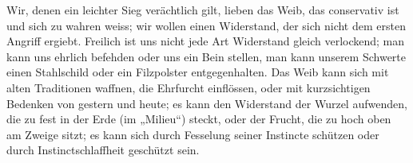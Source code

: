 Wir, denen ein leichter Sieg verächtlich gilt, lieben das Weib, das conservativ ist und sich zu wahren weiss; wir wollen einen Widerstand, der sich nicht dem ersten Angriff ergiebt. Freilich ist uns nicht jede Art Widerstand gleich verlockend; man kann uns ehrlich befehden oder uns ein Bein stellen, man kann unserem Schwerte einen Stahlschild oder ein Filzpolster entgegenhalten. Das Weib kann sich mit alten Traditionen waffnen, die Ehrfurcht einflössen, oder mit kurzsichtigen Bedenken von gestern und heute; es kann den Widerstand der Wurzel aufwenden, die zu fest in der Erde (im „Milieu“) steckt, oder der Frucht, die zu hoch oben am Zweige sitzt; es kann sich durch Fesselung seiner Instincte schützen oder durch Instinctschlaffheit geschützt sein.
\par

